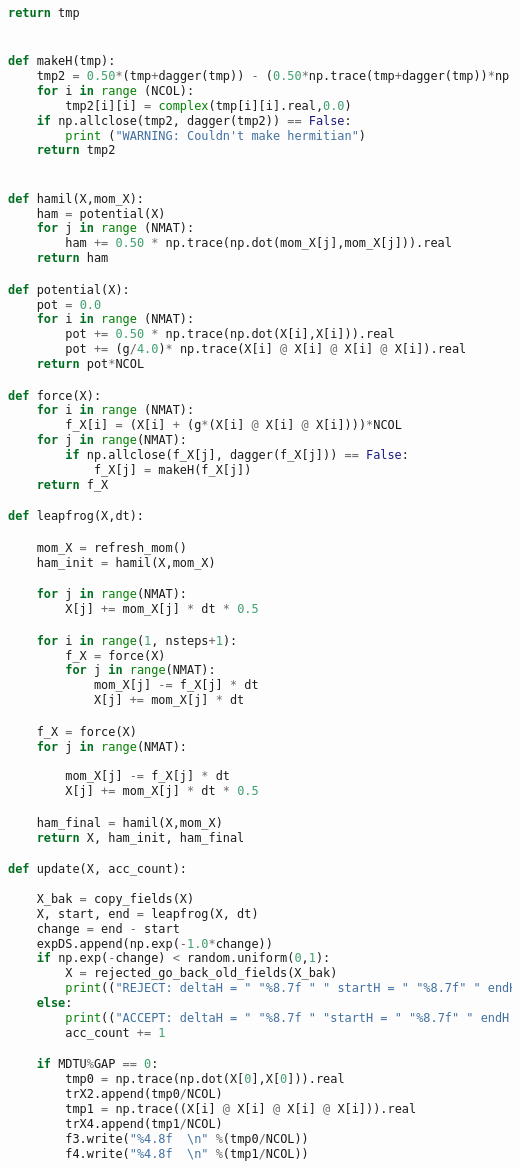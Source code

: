 \begin{footnotesize}
\begin{lstlisting}[language=Python]
    return tmp


def makeH(tmp):
    tmp2 = 0.50*(tmp+dagger(tmp)) - (0.50*np.trace(tmp+dagger(tmp))*np.eye(NCOL))/NCOL
    for i in range (NCOL):
        tmp2[i][i] = complex(tmp[i][i].real,0.0)  
    if np.allclose(tmp2, dagger(tmp2)) == False:
        print ("WARNING: Couldn't make hermitian")
    return tmp2


def hamil(X,mom_X):
    ham = potential(X) 
    for j in range (NMAT):
        ham += 0.50 * np.trace(np.dot(mom_X[j],mom_X[j])).real 
    return ham  

def potential(X):
    pot = 0.0 
    for i in range (NMAT):
        pot += 0.50 * np.trace(np.dot(X[i],X[i])).real   
        pot += (g/4.0)* np.trace(X[i] @ X[i] @ X[i] @ X[i]).real
    return pot*NCOL

def force(X): 
    for i in range (NMAT): 
        f_X[i] = (X[i] + (g*(X[i] @ X[i] @ X[i])))*NCOL
    for j in range(NMAT):
        if np.allclose(f_X[j], dagger(f_X[j])) == False:
            f_X[j] = makeH(f_X[j])
    return f_X

def leapfrog(X,dt):

    mom_X = refresh_mom()
    ham_init = hamil(X,mom_X)

    for j in range(NMAT):
        X[j] += mom_X[j] * dt * 0.5 

    for i in range(1, nsteps+1):
        f_X = force(X)
        for j in range(NMAT):
            mom_X[j] -= f_X[j] * dt
            X[j] += mom_X[j] * dt

    f_X = force(X)
    for j in range(NMAT):
        
        mom_X[j] -= f_X[j] * dt
        X[j] += mom_X[j] * dt * 0.5 

    ham_final = hamil(X,mom_X)
    return X, ham_init, ham_final

def update(X, acc_count):
    
    X_bak = copy_fields(X) 
    X, start, end = leapfrog(X, dt) 
    change = end - start  
    expDS.append(np.exp(-1.0*change)) 
    if np.exp(-change) < random.uniform(0,1):
        X = rejected_go_back_old_fields(X_bak)
        print(("REJECT: deltaH = " "%8.7f " " startH = " "%8.7f" " endH = " "%8.7f" % (change, start, end)))
    else:   
        print(("ACCEPT: deltaH = " "%8.7f " "startH = " "%8.7f" " endH = " "%8.7f" % (change, start, end)))
        acc_count += 1 

    if MDTU%GAP == 0:
        tmp0 = np.trace(np.dot(X[0],X[0])).real
        trX2.append(tmp0/NCOL)
        tmp1 = np.trace((X[i] @ X[i] @ X[i] @ X[i])).real
        trX4.append(tmp1/NCOL)
        f3.write("%4.8f  \n" %(tmp0/NCOL))
        f4.write("%4.8f  \n" %(tmp1/NCOL))
    

\end{lstlisting}
\end{footnotesize}
